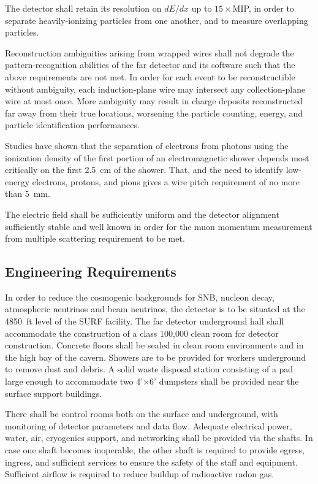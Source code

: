 The detector shall retain its resolution on $dE/dx$ up to $15\times
$MIP, in order to separate heavily-ionizing particles from one
another, and to measure overlapping particles.

Reconstruction ambiguities arising from wrapped wires shall not
degrade the pattern-recognition abilities of the far detector and its
software such that the above requirements are not met.  In order for
each event to be reconstructible without ambiguity, each
induction-plane wire may intersect any collection-plane wire at most
once.  More ambiguity may result in charge deposits reconstructed far
away from their true locations, worsening the particle counting,
energy, and particle identification performances.

Studies have shown that the separation of electrons from photons
using the ionization density of the first portion of an electromagnetic shower
depends most critically on the first 2.5~cm of the shower.  That, and the need
to identify low-energy electrons, protons, and pions gives a wire pitch
requirement of no more than 5~mm.

The electric field shall be sufficiently uniform and the detector alignment
sufficiently stable and well known in order for the muon momentum measurement
from multiple scattering requirement to be met.

\subsection{Engineering Requirements}

In order to reduce the cosmogenic backgrounds for SNB, nucleon decay,
atmospheric neutrinos and beam neutrinos, the detector is to be situated
at the 4850~ft level of the SURF facility.  The far detector underground hall shall
accommodate the construction of a class 100,000 clean room for detector
construction.   Concrete floors shall be sealed in %
clean room environments
and in the high bay of the cavern.  Showers are to be provided for workers underground
to remove dust and debris.  A solid waste disposal station consisting of a pad
large enough to accommodate two 4'$\times$6' dumpsters shall be provided near
the surface support buildings.

There shall be control rooms both on the surface and underground, with monitoring
of detector parameters and data flow.  Adequate electrical power, water, air,
cryogenics support, and networking shall be provided via the shafts.   In case
one shaft becomes inoperable, the other shaft is required to provide egress, ingress,
and sufficient services to ensure the safety of the staff and equipment.
Sufficient airflow is required to reduce buildup of radioactive radon gas.


